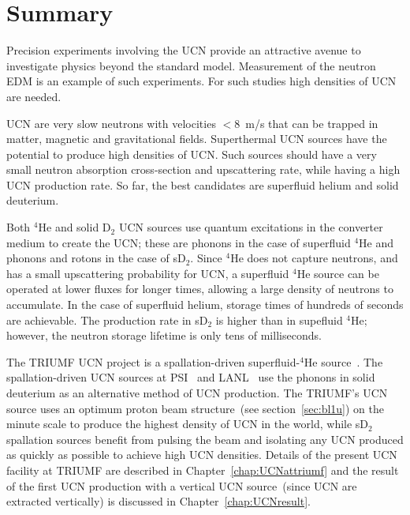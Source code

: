 \section{Summary}
Precision experiments involving the UCN provide an attractive avenue
to investigate physics beyond the standard model. Measurement of the
neutron EDM is an example of such experiments. For such studies high
densities of UCN are needed.

UCN are very slow neutrons with velocities $<8$~m/s that can be
trapped in matter, magnetic and gravitational fields.  Superthermal
UCN sources have the potential to produce high densities of UCN. Such
sources should have a very small neutron absorption cross-section and
upscattering rate, while having a high UCN production rate. So far,
the best candidates are superfluid helium and solid deuterium.

Both $^4$He and solid D$_2$ UCN sources use quantum excitations in the
converter medium to create the UCN; these are phonons in the case of
superfluid $^4$He and phonons and rotons in the case of sD$_2$. Since
$^4$He does not capture neutrons, and has a small upscattering
probability for UCN, a superfluid $^4$He source can be operated at
lower fluxes for longer times, allowing a large density of neutrons to
accumulate. In the case of superfluid helium, storage times of
hundreds of seconds are achievable. The production rate in sD$_2$ is
higher than in supefluid $^4$He; however, the neutron storage lifetime
is only tens of milliseconds.

The TRIUMF UCN project is a spallation-driven superfluid-$^4$He
source~\cite{Ruediger}. The spallation-driven UCN sources at
PSI~\cite{Ries_ascona} and LANL~\cite{Ito_ascona} use the phonons in
solid deuterium as an alternative method of UCN production.
The TRIUMF's UCN source uses an optimum proton beam structure~(see
section~\ref{sec:bl1u}) on the minute scale to produce the highest
density of UCN in the world, while sD$_2$ spallation sources benefit
from pulsing the beam and isolating any UCN produced as quickly as
possible to achieve high UCN densities.  Details of the present
UCN facility at TRIUMF are described in Chapter~\ref{chap:UCNattriumf}
and the result of the first UCN production with a vertical UCN
source~(since UCN are extracted vertically) is discussed in
Chapter~\ref{chap:UCNresult}.

